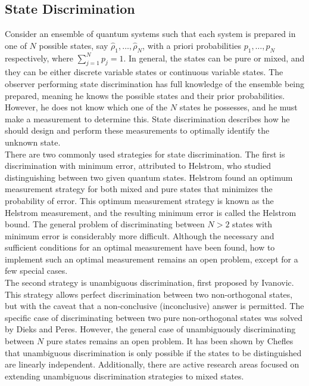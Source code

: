 \subsection{State Discrimination}
Consider an ensemble of quantum systems such that each system is prepared in one of $N$ possible states, say $\hat{\rho}_1, \ldots, \hat{\rho}_N$, with a priori probabilities $p_1, \ldots, p_N$ respectively, where $\sum_{j=1}^N p_j = 1$. In general, the states can be pure or mixed, and they can be either discrete variable states or continuous variable states. The observer performing state discrimination has full knowledge of the ensemble being prepared, meaning he knows the possible states and their prior probabilities. However, he does not know which one of the $N$ states he possesses, and he must make a measurement to determine this. State discrimination describes how he should design and perform these measurements to optimally identify the unknown state.\\

There are two commonly used strategies for state discrimination. The first is discrimination with minimum error, attributed to Helstrom, who studied distinguishing between two given quantum states. Helstrom found an optimum measurement strategy for both mixed and pure states that minimizes the probability of error. This optimum measurement strategy is known as the Helstrom measurement, and the resulting minimum error is called the Helstrom bound. The general problem of discriminating between $N>2$ states with minimum error is considerably more difficult. Although the necessary and sufficient conditions for an optimal measurement have been found, how to implement such an optimal measurement remains an open problem, except for a few special cases.\\

The second strategy is unambiguous discrimination, first proposed by Ivanovic. This strategy allows perfect discrimination between two non-orthogonal states, but with the caveat that a non-conclusive (inconclusive) answer is permitted. The specific case of discriminating between two pure non-orthogonal states was solved by Dieks and Peres. However, the general case of unambiguously discriminating between $N$ pure states remains an open problem. It has been shown by Chefles that unambiguous discrimination is only possible if the states to be distinguished are linearly independent. Additionally, there are active research areas focused on extending unambiguous discrimination strategies to mixed states.\\

